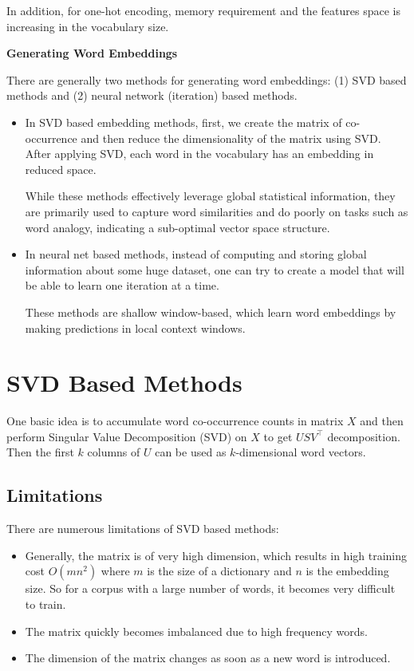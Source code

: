 \documentclass[
]{book}
\providecommand{\tightlist}{%
  \setlength{\itemsep}{0pt}\setlength{\parskip}{0pt}}
\begin{document}
In addition, for one-hot encoding, memory requirement and the features space is increasing in the vocabulary size.

\textbf{Generating Word Embeddings}

There are generally two methods for generating word embeddings: (1) SVD based methods and (2) neural network (iteration) based methods.

\begin{itemize}
\item
  In SVD based embedding methods, first, we create the matrix of co-occurrence and then reduce the dimensionality of the matrix using SVD. After applying SVD, each word in the vocabulary has an embedding in reduced space.

  While these methods effectively leverage global statistical information, they are primarily used to capture word similarities and do poorly on tasks such as word analogy, indicating a sub-optimal vector space structure.
\item
  In neural net based methods, instead of computing and storing global information about some huge dataset, one can try to create a model that will be able to learn one iteration at a time.

  These methods are shallow window-based, which learn word embeddings by making predictions in local context windows.
\end{itemize}

\hypertarget{svd-based-methods}{%
\section{SVD Based Methods}\label{svd-based-methods}}

One basic idea is to accumulate word co-occurrence counts in matrix \(X\) and then perform Singular Value Decomposition (SVD) on \(X\) to get \(USV^\top\) decomposition. Then the first \(k\) columns of \(U\) can be used as \(k\)-dimensional word vectors.

\hypertarget{limitations}{%
\subsection{Limitations}\label{limitations}}

There are numerous limitations of SVD based methods:

\begin{itemize}
\tightlist
\item
  Generally, the matrix is of very high dimension, which results in high training cost \(O(mn^2)\) where \(m\) is the size of a dictionary and \(n\) is the embedding size. So for a corpus with a large number of words, it becomes very difficult to train.
\item
  The matrix quickly becomes imbalanced due to high frequency words.
\item
  The dimension of the matrix changes as soon as a new word is introduced.
\end{itemize}
\end{document}
